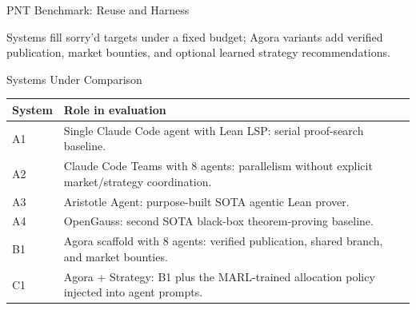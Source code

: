 \documentclass[10pt,aspectratio=169]{beamer}
\begin{document}
\begin{frame}{PNT Benchmark: Reuse and Harness}
\scriptsize
\centering
{}

\vspace{0.8em}
\small
Systems fill sorry'd targets under a fixed budget; Agora variants add verified publication, market bounties, and optional learned strategy recommendations.
\end{frame}

\begin{frame}{Systems Under Comparison}
\small
\begin{tabular}{p{}p{}}
\toprule
\textbf{System} & \textbf{Role in evaluation} \\
\midrule
A1 & Single Claude Code agent with Lean LSP: serial proof-search baseline. \\
A2 & Claude Code Teams with 8 agents: parallelism without explicit market/strategy coordination. \\
A3 & Aristotle Agent: purpose-built SOTA agentic Lean prover. \\
A4 & OpenGauss: second SOTA black-box theorem-proving baseline. \\
B1 & Agora scaffold with 8 agents: verified publication, shared branch, and market bounties. \\
C1 & Agora + Strategy: B1 plus the MARL-trained allocation policy injected into agent prompts. \\
\bottomrule
\end{tabular}
\end{frame}
\end{document}

